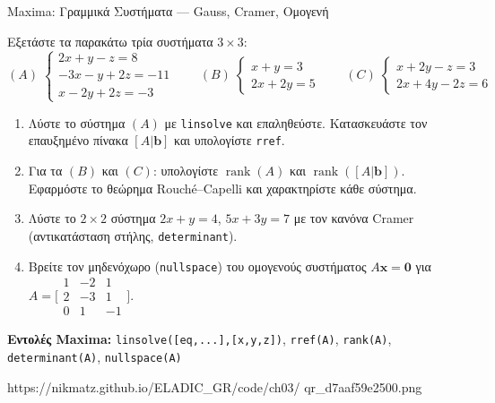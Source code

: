 %

\casactivbox%
  {Maxima: Γραμμικά Συστήματα — Gauss, Cramer, Ομογενή}%
  {%
    \label{cas:ch3_linear_systems}
    Εξετάστε τα παρακάτω τρία συστήματα $3\times 3$:
    \[
      (A)\;
      \begin{cases}
        2x + y - z = 8\\
       -3x - y + 2z = -11\\
        x - 2y + 2z = -3
      \end{cases}
      \qquad
      (B)\;
      \begin{cases}
        x + y = 3\\
        2x + 2y = 5
      \end{cases}
      \qquad
      (C)\;
      \begin{cases}
        x + 2y - z = 3\\
        2x + 4y - 2z = 6
      \end{cases}
    \]
    \begin{enumerate}[label=(\alph*),itemsep=2pt]
      \item Λύστε το σύστημα $(A)$ με \texttt{linsolve} και επαληθεύστε.
        Κατασκευάστε τον επαυξημένο πίνακα $[A|\mathbf{b}]$ και υπολογίστε
        \texttt{rref}.
      \item Για τα $(B)$ και $(C)$: υπολογίστε $\operatorname{rank}(A)$ και
        $\operatorname{rank}([A|\mathbf{b}])$. Εφαρμόστε το θεώρημα
        Rouché–Capelli και χαρακτηρίστε κάθε σύστημα.
      \item Λύστε το $2\times 2$ σύστημα $2x+y=4$, $5x+3y=7$ με τον
        κανόνα Cramer (αντικατάσταση στήλης, \texttt{determinant}).
      \item Βρείτε τον μηδενόχωρο (\texttt{nullspace}) του ομογενούς
        συστήματος $A\mathbf{x}=\mathbf{0}$ για
        $A=\bigl[\begin{smallmatrix}1&-2&1\\2&-3&1\\0&1&-1\end{smallmatrix}\bigr]$.
    \end{enumerate}
    \smallskip
    \textbf{Εντολές Maxima:}
    \texttt{linsolve([eq,...],[x,y,z])}, \texttt{rref(A)},
    \texttt{rank(A)}, \texttt{determinant(A)}, \texttt{nullspace(A)}
  }%
  {https://nikmatz.github.io/ELADIC_GR/code/ch03/}%
  {qr_d7aaf59e2500.png}

